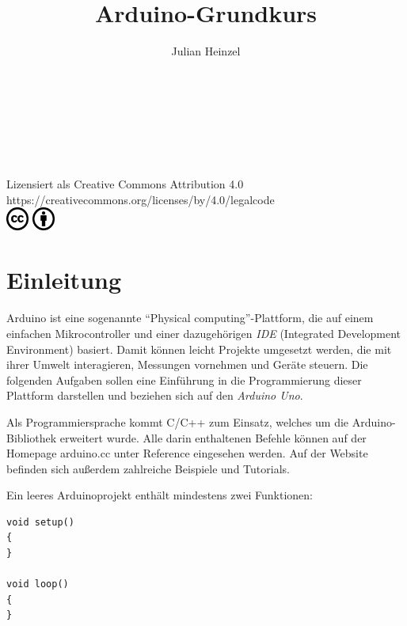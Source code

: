 \documentclass[10pt,a4paper]{article}
\title{Arduino-Grundkurs}
\author{Julian Heinzel}
\begin{document}
\begin{center}
	\makeatletter
	{\LARGE\textbf{\@title}}\\\bigskip
	{\Large\@author}\\\medskip
	{\large\@date}\\
	\makeatother
	\vspace{0.3cm}
	\\\medskip
	Lizensiert als Creative Commons Attribution 4.0\\
	https://creativecommons.org/licenses/by/4.0/legalcode
	\\\medskip
	\includegraphics[width=0.75cm]{CC.png}
	\includegraphics[width=0.75cm]{BY.png}
\end{center}
\vspace{0.3cm}
\tableofcontents
\vspace{1cm}


\section{Einleitung}
Arduino ist eine sogenannte "`Physical computing"'-Plattform, die auf einem einfachen Mikrocontroller und einer dazugehörigen \emph{IDE} (Integrated Development Environment) basiert. Damit können leicht Projekte umgesetzt werden, die mit ihrer Umwelt interagieren, Messungen vornehmen und Geräte steuern. Die folgenden Aufgaben sollen eine Einführung in die Programmierung dieser Plattform darstellen und beziehen sich auf den \emph{Arduino Uno}.
\bigskip

Als Programmiersprache kommt C/C++ zum Einsatz, welches um die Arduino-Bibliothek erweitert wurde. Alle darin enthaltenen Befehle können auf der Homepage arduino.cc unter Reference eingesehen werden. Auf der Website befinden sich außerdem zahlreiche Beispiele und Tutorials.
\bigskip

Ein leeres Arduinoprojekt enthält mindestens zwei Funktionen:
\begin{lstlisting}
void setup()
{
}

void loop()
{
}
\end{lstlisting}
\end{document}
